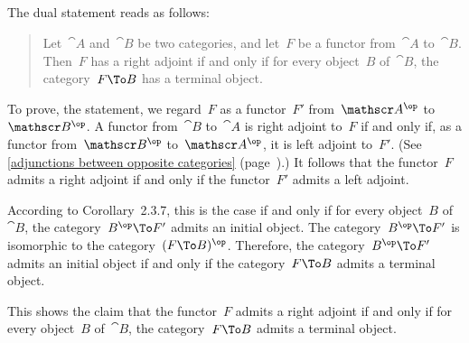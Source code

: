 \subsection{}

The dual statement reads as follows:
\begin{quote}
	Let~$\cat{A}$ and~$\cat{B}$ be two categories, and let~$F$ be a functor from~$\cat{A}$ to~$\cat{B}$.
	Then~$F$ has a right adjoint if and only if for every object~$B$ of~$\cat{B}$, the category~$F \To B$ has a terminal object.
\end{quote}

To prove, the statement, we regard~$F$ as a functor~$F'$ from~$\cat{A}^{\op}$ to~$\cat{B}^{\op}$.
A functor from~$\cat{B}$ to~$\cat{A}$ is right adjoint to~$F$ if and only if, as a functor from~$\cat{B}^{\op}$ to~$\cat{A}^{\op}$, it is left adjoint to~$F'$.
(See \cref{adjunctions between opposite categories} (page~\pageref{adjunctions between opposite categories}).)
It follows that the functor~$F$ admits a right adjoint if and only if the functor~$F'$ admits a left adjoint.

According to Corollary~2.3.7, this is the case if and only if for every object~$B$ of~$\cat{B}$, the category~$B^{\op} \To F'$ admits an initial object.
The category~$B^{\op} \To F'$ is isomorphic to the category~$(F \To B)^{\op}$.
Therefore, the category~$B^{\op} \To F'$ admits an initial object if and only if the category~$F \To B$ admits a terminal object.

This shows the claim that the functor~$F$ admits a right adjoint if and only if for every object~$B$ of~$\cat{B}$, the category~$F \To B$ admits a terminal object.

